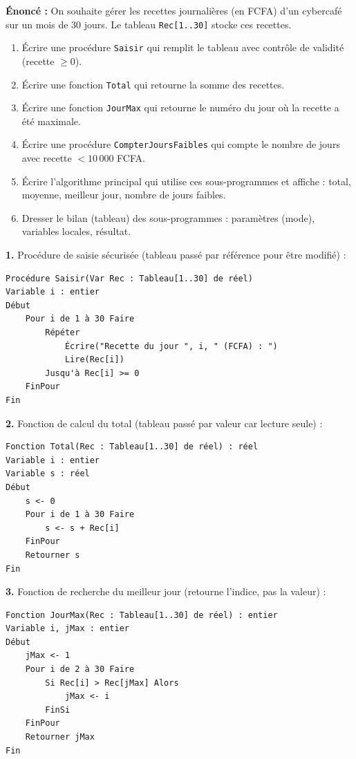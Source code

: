 \documentclass[11pt]{article}
\begin{document}
\begin{corrige}
\textbf{Énoncé :} On souhaite gérer les recettes journalières (en FCFA) d'un cybercafé sur un mois de 30 jours. Le tableau \texttt{Rec[1..30]} stocke ces recettes.
\begin{enumerate}
  \item Écrire une procédure \texttt{Saisir} qui remplit le tableau avec contrôle de validité (recette $\ge 0$).
  \item Écrire une fonction \texttt{Total} qui retourne la somme des recettes.
  \item Écrire une fonction \texttt{JourMax} qui retourne le numéro du jour où la recette a été maximale.
  \item Écrire une procédure \texttt{CompterJoursFaibles} qui compte le nombre de jours avec recette $< 10\,000$ FCFA.
  \item Écrire l'algorithme principal qui utilise ces sous-programmes et affiche : total, moyenne, meilleur jour, nombre de jours faibles.
  \item Dresser le bilan (tableau) des sous-programmes : paramètres (mode), variables locales, résultat.
\end{enumerate}
\tcblower
\textbf{1.} Procédure de saisie sécurisée (tableau passé par référence pour être modifié) :

\begin{lstlisting}
Procédure Saisir(Var Rec : Tableau[1..30] de réel)
Variable i : entier
Début
    Pour i de 1 à 30 Faire
        Répéter
            Écrire("Recette du jour ", i, " (FCFA) : ")
            Lire(Rec[i])
        Jusqu'à Rec[i] >= 0
    FinPour
Fin
\end{lstlisting}

\textbf{2.} Fonction de calcul du total (tableau passé par valeur car lecture seule) :

\begin{lstlisting}
Fonction Total(Rec : Tableau[1..30] de réel) : réel
Variable i : entier
Variable s : réel
Début
    s <- 0
    Pour i de 1 à 30 Faire
        s <- s + Rec[i]
    FinPour
    Retourner s
Fin
\end{lstlisting}

\textbf{3.} Fonction de recherche du meilleur jour (retourne l'indice, pas la valeur) :

\begin{lstlisting}
Fonction JourMax(Rec : Tableau[1..30] de réel) : entier
Variable i, jMax : entier
Début
    jMax <- 1
    Pour i de 2 à 30 Faire
        Si Rec[i] > Rec[jMax] Alors
            jMax <- i
        FinSi
    FinPour
    Retourner jMax
Fin
\end{lstlisting}


\end{corrige}
\end{document}
